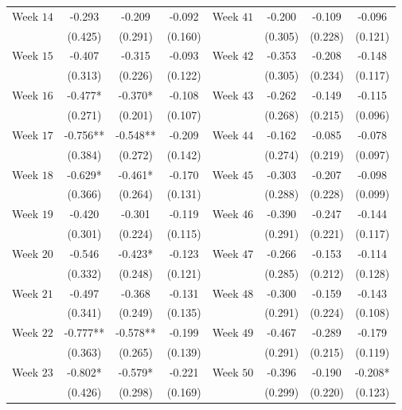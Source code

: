 \begin{table}[htbp]
\begin{tabular}{lccc lccc}
Week $14$ & -0.293 & -0.209 & -0.092 & Week $41$ & -0.200 & -0.109 & -0.096 \\
          & (0.425) & (0.291) & (0.160) &           & (0.305) & (0.228) & (0.121) \\

Week $15$ & -0.407 & -0.315 & -0.093 & Week $42$ & -0.353 & -0.208 & -0.148 \\
          & (0.313) & (0.226) & (0.122) &           & (0.305) & (0.234) & (0.117) \\

Week $16$ & -0.477* & -0.370* & -0.108 & Week $43$ & -0.262 & -0.149 & -0.115 \\
          & (0.271) & (0.201) & (0.107) &           & (0.268) & (0.215) & (0.096) \\

Week $17$ & -0.756** & -0.548** & -0.209 & Week $44$ & -0.162 & -0.085 & -0.078 \\
          & (0.384)  & (0.272)  & (0.142) &           & (0.274) & (0.219) & (0.097) \\

Week $18$ & -0.629* & -0.461* & -0.170 & Week $45$ & -0.303 & -0.207 & -0.098 \\
          & (0.366) & (0.264) & (0.131) &           & (0.288) & (0.228) & (0.099) \\

Week $19$ & -0.420 & -0.301 & -0.119 & Week $46$ & -0.390 & -0.247 & -0.144 \\
          & (0.301) & (0.224) & (0.115) &           & (0.291) & (0.221) & (0.117) \\

Week $20$ & -0.546 & -0.423* & -0.123 & Week $47$ & -0.266 & -0.153 & -0.114 \\
          & (0.332) & (0.248) & (0.121) &           & (0.285) & (0.212) & (0.128) \\

Week $21$ & -0.497 & -0.368 & -0.131 & Week $48$ & -0.300 & -0.159 & -0.143 \\
          & (0.341) & (0.249) & (0.135) &           & (0.291) & (0.224) & (0.108) \\

Week $22$ & -0.777** & -0.578** & -0.199 & Week $49$ & -0.467 & -0.289 & -0.179 \\
          & (0.363)  & (0.265)  & (0.139) &           & (0.291) & (0.215) & (0.119) \\

Week $23$ & -0.802* & -0.579* & -0.221 & Week $50$ & -0.396 & -0.190 & -0.208* \\
          & (0.426) & (0.298) & (0.169) &           & (0.299) & (0.220) & (0.123) \\


\end{tabular}
\end{table}
